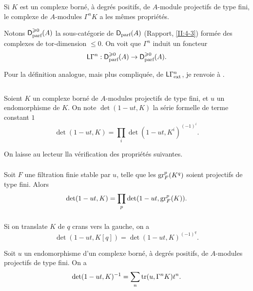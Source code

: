 \subsection{}\label{III:1-6}

Si $K$ est un complexe borné, à degrés positifs, de $A$-module projectifs 
de type fini, le complexe de $A$-modules $\Gamma^n K$ a les mêmes 
propriétés. 

Notons $\mathsf{D}_\text{parf}^{\geqslant 0}(A)$ la sous-catégorie de 
$\mathsf{D}_\text{parf}(A)$ (Rapport, \ref{II:4-3}) formée des complexes de 
tor-dimension $\leqslant 0$. On voit que $\Gamma^n$ induit un foncteur 
\[
  \mathsf{L}\Gamma^n : \mathsf{D}_\text{parf}^{\geqslant 0}(A) \to \mathsf{D}_\text{parf}^{\geqslant 0}(A) \text{.}
\]

Pour la définition analogue, mais plus compliquée, de 
$\mathsf{L}\Gamma_\text{ext}^n$, je renvoie à \cite[XVII 5.5.14]{sga4}. 





\subsection{}\label{III:1-7}

Soient $K$ un complexe borné de $A$-modules projectifs de type fini, et $u$ 
un endomorphisme de $K$. On note $\det(1-u t,K)$ la série formelle de terme 
constant $1$ 
\[
  \det(1-u t,K) = \prod_i \det(1-u t,K^i)^{(-1)^i} \text{.}
\]

On laisse au lecteur lla vérification des propriétés suivantes. 


\subsubsection{}\label{III:1-7-1}

Soit $F$ une filtration finie stable par $u$, telle que les $\operatorname{gr}_F^p(K^q)$ 
soient projectifs de type fini. Alors 
\[
  \det(1-u t,K) = \prod_p \det(1-u t,\operatorname{gr}_F^p(K)) \text{.}
\]


\subsubsection{}\label{III:1-7-2}

Si on translate $K$ de $q$ crans vers la gauche, on a 
\[
  \det(1-u t,K[q]) = \det(1-u t,K)^{(-1)^q} \text{.}
\]





\begin{proposition_}\label{III:1-8}
Soit $u$ un endomorphisme d'un complexe borné, à degrés positifs, de 
$A$-modules projectifs de type fini. On a \
\begin{equation}\label{III:eq:1-8-1}
  \det(1-u t,K)^{-1} = \sum_n \operatorname{tr}(u,\Gamma^n K) t^n \text{.}
\end{equation}
\end{proposition_}

